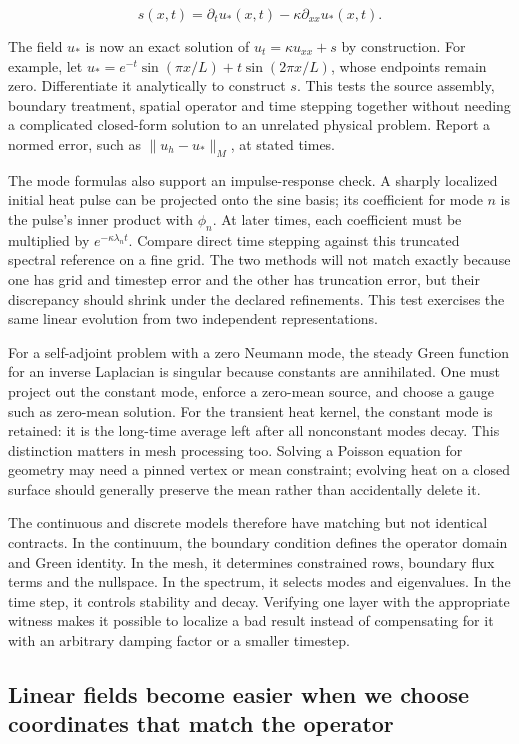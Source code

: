 \[
s(x,t)=\partial_tu_*(x,t)-\kappa\partial_{xx}u_*(x,t).
\]

The field \(u_*\) is now an exact solution of \(u_t=\kappa u_{xx}+s\) by construction. For example, let \(u_*=e^{-t}\sin(\pi x/L)+t\sin(2\pi x/L)\), whose endpoints remain zero. Differentiate it analytically to construct \(s\). This tests the source assembly, boundary treatment, spatial operator and time stepping together without needing a complicated closed-form solution to an unrelated physical problem. Report a normed error, such as \(\|u_h-u_*\|_M\), at stated times.

The mode formulas also support an impulse-response check. A sharply localized initial heat pulse can be projected onto the sine basis; its coefficient for mode \(n\) is the pulse's inner product with \(\phi_n\). At later times, each coefficient must be multiplied by \(e^{-\kappa\lambda_nt}\). Compare direct time stepping against this truncated spectral reference on a fine grid. The two methods will not match exactly because one has grid and timestep error and the other has truncation error, but their discrepancy should shrink under the declared refinements. This test exercises the same linear evolution from two independent representations.

For a self-adjoint problem with a zero Neumann mode, the steady Green function for an inverse Laplacian is singular because constants are annihilated. One must project out the constant mode, enforce a zero-mean source, and choose a gauge such as zero-mean solution. For the transient heat kernel, the constant mode is retained: it is the long-time average left after all nonconstant modes decay. This distinction matters in mesh processing too. Solving a Poisson equation for geometry may need a pinned vertex or mean constraint; evolving heat on a closed surface should generally preserve the mean rather than accidentally delete it.

The continuous and discrete models therefore have matching but not identical contracts. In the continuum, the boundary condition defines the operator domain and Green identity. In the mesh, it determines constrained rows, boundary flux terms and the nullspace. In the spectrum, it selects modes and eigenvalues. In the time step, it controls stability and decay. Verifying one layer with the appropriate witness makes it possible to localize a bad result instead of compensating for it with an arbitrary damping factor or a smaller timestep.

\subsection{Linear fields become easier when we choose coordinates that match the operator}\label{02-foundations-ii-ch025-linear-fields-become-easier-when-we-choose-coordinates-that-match-the-operator}

